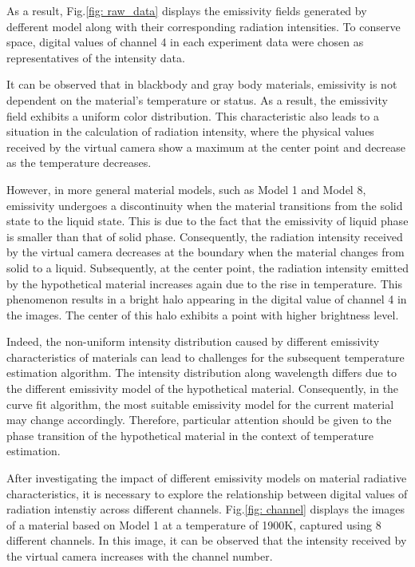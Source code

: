 As a result, Fig.\ref{fig: raw_data} displays the emissivity fields generated by defferent
model along with their corresponding radiation intensities. To conserve space, 
digital values of channel 4 in each experiment data were chosen as 
representatives of the intensity data.


It can be observed that in blackbody and gray body materials, emissivity is not 
dependent on the material's temperature or status. As a result, the emissivity 
field exhibits a uniform color distribution. This characteristic also leads to a 
situation in the calculation of radiation intensity, where the physical values 
received by the virtual camera show a maximum at the center point and decrease 
as the temperature decreases.


However, in more general material models, such as Model 1 and Model 8, emissivity 
undergoes a discontinuity when the material transitions from the solid state to 
the liquid state. This is due to the fact that the emissivity of liquid phase 
is smaller than that of solid phase. Consequently, the radiation intensity 
received by the virtual camera decreases at the boundary when the material 
changes from solid to a liquid. Subsequently, at the center point, the radiation 
intensity emitted by the hypothetical material increases again due to the rise in 
temperature. This phenomenon results in a bright halo appearing in the digital 
value of channel 4 in the images. The center of this 
halo exhibits a point with higher brightness level.


Indeed, the non-uniform intensity distribution caused by different emissivity 
characteristics of materials can lead to challenges for the subsequent 
temperature estimation algorithm. The intensity distribution along wavelength 
differs due to the different emissivity model of the hypothetical material. 
Consequently, in the curve fit algorithm, the most suitable emissivity model for 
the current material may change accordingly. Therefore, particular attention 
should be given to the phase transition of the hypothetical material in the 
context of temperature estimation. 


After investigating the impact of different emissivity models on material 
radiative characteristics, it is necessary to explore the relationship between 
digital values of radiation intenstiy across different channels. 
Fig.\ref{fig: channel} displays the images of a material based on Model 1 at a 
temperature of 1900K, captured using 8 different channels. In this image, 
it can be observed that the intensity received by the virtual camera increases 
with the channel number.

